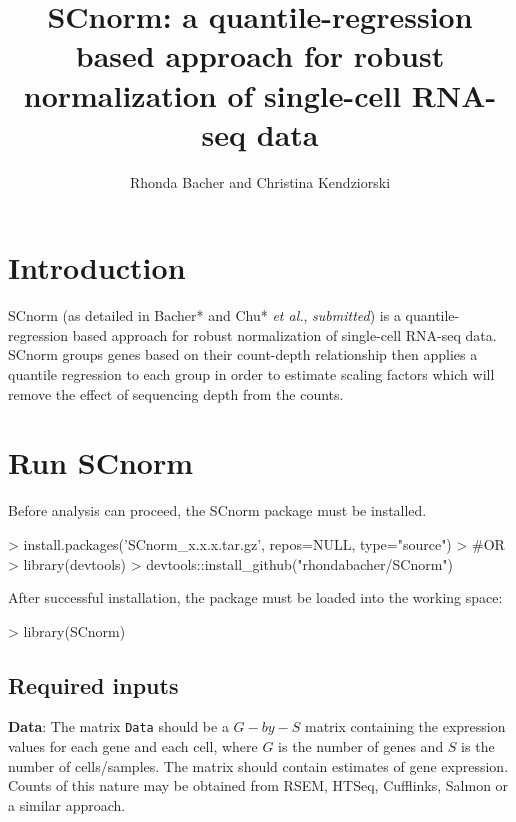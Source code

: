 \documentclass{article}
\begin{document}

\title{SCnorm: a quantile-regression based approach for robust normalization of single-cell RNA-seq data}
\author{Rhonda Bacher and Christina Kendziorski}
\maketitle
\tableofcontents
\setcounter{tocdepth}{2}

\section{Introduction}
\label{sec:intro}
SCnorm (as detailed in Bacher* and Chu* {\it et al.}, {\it{submitted}}) 
is a quantile-regression based approach for robust normalization of 
single-cell RNA-seq data. SCnorm groups genes based on their count-depth relationship then applies a quantile regression to each group in order to estimate scaling factors which will remove the effect of sequencing depth from the counts. 

\section{Run SCnorm}
\label{sec:quickstart}
Before analysis can proceed, the SCnorm package must be installed.
\begin{Schunk}
\begin{Sinput}
> install.packages('SCnorm_x.x.x.tar.gz', repos=NULL, type="source")
> #OR
> library(devtools)
> devtools::install_github("rhondabacher/SCnorm")
\end{Sinput}
\end{Schunk}

After successful installation, the package must be loaded into the working space:
\begin{Schunk}
\begin{Sinput}
>   library(SCnorm)
\end{Sinput}
\end{Schunk}
  
  \subsection{Required inputs}
\label{sec:startgenedeinput}
\begin{flushleft}
{\bf Data}:  The matrix \verb+Data+ should be a $G-by-S$ matrix
containing the expression values for each gene and each cell,
where $G$ is the number of genes and $S$ is the number of cells/samples. The matrix should contain
estimates of gene expression. Counts of this nature may be obtained from RSEM, HTSeq, Cufflinks, Salmon or a similar approach.
\end{flushleft}
\end{document}
